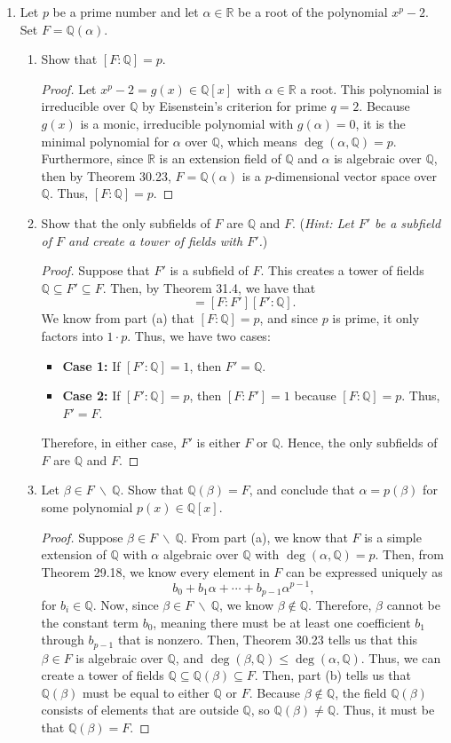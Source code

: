 \documentclass[12pt]{article}
\newcommand{\Q}{\mathbb{Q}}
\newcommand{\R}{\mathbb{R}}
\newcommand{\pf}[1]{
    \begin{customframedproof}[linecolor=orangehdx!75]
        \begin{proof}
        #1
        \end{proof}
    \end{customframedproof}
}
\begin{document}
\begin{enumerate}
	\item Let \(p\) be a prime number and let \(\alpha \in \R\) be a root of the polynomial \(x^{p} - 2\). Set \(F = \Q(\alpha)\).
	\begin{enumerate}
		\item Show that \([F : \Q] = p\).
		\pf{
			Let \(x^{p} - 2 = g(x) \in \Q[x]\) with \(\alpha \in \R\) a root. This polynomial is irreducible over \(\Q\) by Eisenstein's criterion for prime \(q = 2\). Because \(g(x)\) is a monic, irreducible polynomial with \(g(\alpha) = 0\), it is the minimal polynomial for \(\alpha\) over \(\Q\), which means \(\deg(\alpha, \Q) = p\). Furthermore, since \(\R\) is an extension field of \(\Q\) and \(\alpha\) is algebraic over \(\Q\), then by Theorem 30.23, \(F = \Q(\alpha)\) is a \(p\)-dimensional vector space over \(\Q\). Thus, \([F : \Q] = p\).
		}
\newpage
		\item Show that the only subfields of \(F\) are \(\Q\) and \(F\). (\textit{Hint: Let \(F'\) be a subfield of \(F\) and create a tower of fields with \(F'\).})
		\pf{
			Suppose that \(F'\) is a subfield of \(F\). This creates a tower of fields \(\Q \subseteq F' \subseteq F\). Then, by Theorem 31.4, we have that 
			\begin{equation}
				[F : \Q] = [F : F'][F' : \Q].
			\end{equation}
			We know from part (a) that \([F : \Q] = p\), and since \(p\) is prime, it only factors into \(1 \cdot p\). Thus, we have two cases:
			\begin{itemize}
				\item \textbf{Case 1:} If \([F' : \Q] = 1\), then \(F' = \Q\).
				\item \textbf{Case 2:} If \([F' : \Q] = p\), then \([F : F'] = 1\) because \([F : \Q] = p\). Thus, \(F' = F\).
			\end{itemize}
			Therefore, in either case, \(F'\) is either \(F\) or \(\Q\). Hence, the only subfields of \(F\) are \(\Q\) and \(F\).
		}

		\item Let \(\beta \in F\ \backslash\ \Q\). Show that \(\Q(\beta) = F\), and conclude that \(\alpha = p(\beta)\) for some polynomial \(p(x) \in \Q[x]\).
		\pf{
			Suppose \(\beta \in F\ \backslash\ \Q\). From part (a), we know that \(F\) is a simple extension of \(\Q\) with \(\alpha\) algebraic over \(\Q\) with \(\deg(\alpha, \Q) = p\). Then, from Theorem 29.18, we know every element in \(F\) can be expressed uniquely as 
			\[
				b_{0} + b_{1}\alpha + \cdots + b_{p - 1}\alpha^{p-1},
			\]
			for \(b_{i} \in \Q\). Now, since \(\beta \in F\ \backslash\ \Q\), we know \(\beta \notin \Q\). Therefore, \(\beta\) cannot be the constant term \(b_{0}\), meaning there must be at least one coefficient \(b_{1}\) through \(b_{p - 1}\) that is nonzero. Then, Theorem 30.23 tells us that this \(\beta \in F\) is algebraic over \(\Q\), and \(\deg(\beta, \Q) \le \deg(\alpha, \Q)\). Thus, we can create a tower of fields \(\Q \subseteq \Q(\beta) \subseteq F\). Then, part (b) tells us that \(\Q(\beta)\) must be equal to either \(\Q\) or \(F\). Because \(\beta \notin \Q\), the field \(\Q(\beta)\) consists of elements that are outside \(\Q\), so \(\Q(\beta) \ne \Q\). Thus, it must be that \(\Q(\beta) = F\).

}
\end{enumerate}
\end{enumerate}
\end{document}
